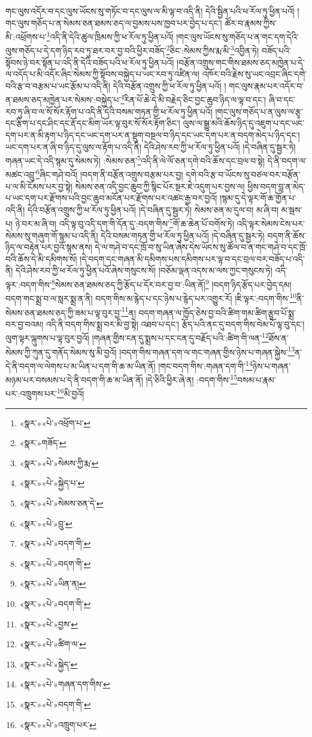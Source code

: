 གང་ལུས་འདོར་བ་དང་ལུས་ཡོངས་སུ་གཏོང་བ་དང་ལུས་ལ་མི་ལྟ་བ་འདི་ནི། དེའི་སྦྱིན་པའི་ཕ་རོལ་ཏུ་ཕྱིན་པའོ། །གང་ལུས་གཅོད་པ་ན་སེམས་ཅན་ཐམས་ཅད་ལ་བྱམས་པས་ཁྱབ་པར་བྱེད་པ་དང་། ཚོར་བ་རྣམས་ཀྱིས་མི་:འཕྲོགས་པ་\footnote{«སྣར་»«པེ་»འཕྲོག་པ་}འདི་ནི་དེའི་ཚུལ་ཁྲིམས་ཀྱི་ཕ་རོལ་ཏུ་ཕྱིན་པའོ། །གང་ལུས་ཡོངས་སུ་གཅོད་པ་ན་གང་དག་དེའི་ལུས་གཅོད་པ་དེ་དག་ཉིད་རབ་ཏུ་ཐར་བར་བྱ་བའི་ཕྱིར་བཟོད་\footnote{«སྣར་»གཟོད་}ཅིང་:སེམས་ཀྱིས་རྨ་མི་\footnote{«སྣར་»«པེ་»སེམས་ཀྱི་རྨ་}འབྱིན་ཏེ། བཟོད་པའི་སྟོབས་ཉེ་བར་སྟོན་པ་འདི་ནི་དེའི་བཟོད་པའི་ཕ་རོལ་ཏུ་ཕྱིན་པའོ། །བརྩོན་འགྲུས་གང་གིས་ཐམས་ཅད་མཁྱེན་པ་དེ་ལ་འདོད་པ་མི་འདོར་ཞིང་སེམས་ཀྱི་སྟོབས་བསྐྱེད་པ་ཡང་རབ་ཏུ་འཛིན་ལ། འཁོར་བའི་རྗེས་སུ་ཡང་འབྲང་ཞིང་དགེ་བའི་རྩ་བ་བརྩམ་པ་ཡང་རྩོམ་པ་འདི་ནི། དེའི་བརྩོན་འགྲུས་ཀྱི་ཕ་རོལ་ཏུ་ཕྱིན་པའོ། །
གང་ལུས་རྣམ་པར་འདོར་བ་ན་ཐམས་ཅད་མཁྱེན་པར་སེམས་:བསྐྱེད་པ་\footnote{«སྣར་»«པེ་»སྐྱེད་པ་}རིན་པོ་ཆེ་དེ་མི་བརྗེད་ཅིང་བྱང་ཆུབ་ཉིད་ལ་ལྟ་བ་དང་། ཞི་བ་དང་རབ་ཏུ་ཞི་བ་ལ་སོ་སོར་རྟོག་པ་འདི་ནི་དེའི་བསམ་གཏན་གྱི་ཕ་རོལ་ཏུ་ཕྱིན་པའོ། །གང་ལུས་གཅོད་པ་ན་ལུས་ལ་རྩྭ་དང་རྩིག་པ་དང་ཤིང་དང་རྡོ་དང་མིག་ཡོར་ལྟ་བུར་སོ་སོར་རྟོག་ཅིང་། ལུས་ལ་སྒྱུ་མའི་ཆོས་ཉིད་དུ་འཇུག་པ་དང་ཡང་དག་པར་ན་མི་རྟག་པ་ཉིད་དང་ཡང་དག་པར་ན་སྡུག་བསྔལ་བ་ཉིད་དང་ཡང་དག་པར་ན་བདག་མེད་པ་ཉིད་དང་། ཡང་དག་པར་ན་ཞི་བ་ཉིད་དུ་ལུས་ལ་རྟོག་པ་འདི་ནི། དེའི་ཤེས་རབ་ཀྱི་ཕ་རོལ་ཏུ་ཕྱིན་པའོ། །དེ་བཞིན་དུ་སྦྱར་ཏེ། གཞན་ཡང་དེ་འདི་སྙམ་དུ་སེམས་ཏེ། :སེམས་ཅན་\footnote{«སྣར་»«པེ་»སེམས་ཅན་དེ་}འདི་ནི་ལེ་ལོ་ཅན་དགེ་བའི་ཆོས་དང་བྲལ་བ་སྟེ། དེ་ནི་བདག་ལ་མཚང་འབྲུ་\footnote{«སྣར་»«པེ་»བྲུ་}ཞིང་གཤེ་བའོ། །བདག་ནི་བརྩོན་འགྲུས་བརྩམ་པར་བྱ། དགེ་བའི་རྩ་བ་ཡོངས་སུ་བཙལ་བར་བརྩོན་པ་ལ་མི་ངོམས་པར་བྱ་སྟེ། སེམས་ཅན་འདི་བྱང་ཆུབ་ཀྱི་སྙིང་པོར་སྔར་ཇེ་འདུག་པར་བྱས་ལ། ཕྱིས་བདག་བླ་ན་མེད་པ་ཡང་དག་པར་རྫོགས་པའི་བྱང་ཆུབ་མངོན་པར་རྫོགས་པར་འཚང་རྒྱ་བར་བྱའོ། །སྙམ་དུ་དེ་ལྟར་གོ་ཆ་གྱོན་པ་འདི་ནི། དེའི་བརྩོན་འགྲུས་ཀྱི་ཕ་རོལ་ཏུ་ཕྱིན་པའོ། །དེ་བཞིན་དུ་སྦྱར་ཏེ། སེམས་ཅན་མ་དུལ་བ། མ་ཞི་བ། མ་སྦས་པ། ཉེ་བར་མ་ཞི་བ། འདི་ལྟ་བུ་འདི་དག་གི་དོན་དུ་:བདག་གིས་\footnote{«སྣར་»«པེ་»བདག་གི་}གོ་ཆ་ཆེན་པོ་བགོས་ཏེ། འདི་ལྟར་སེམས་ངེས་པར་སེམས་སུ་གཞུག་གོ་སྙམ་པ་འདི་ནི། དེའི་བསམ་གཏན་གྱི་ཕ་རོལ་ཏུ་ཕྱིན་པའོ། །དེ་བཞིན་དུ་སྦྱར་ཏེ། བདག་ནི་ཆོས་ཉིད་ལ་བརྟེན་པར་བྱའོ་སྙམ་ནས། དེ་ལ་གཤེ་བ་དང་ཁྲོ་བ་སུ་ཡིན་ཞེས་དེས་ཡོངས་སུ་ཚོལ་བ་ན་གང་གཤེ་བ་དང་ཁྲོ་བའི་ཆོས་དེ་མི་དམིགས་སོ། །དེ་བདག་དང་གཞན་མི་དམིགས་པས་དམིགས་པར་ལྟ་བ་དང་བྲལ་བར་བཟོད་པ་འདི་ནི། དེའི་ཤེས་རབ་ཀྱི་ཕ་རོལ་ཏུ་ཕྱིན་པའོ་ཞེས་གསུངས་སོ། །བཅོམ་ལྡན་འདས་མ་ལས་ཀྱང་གསུངས་ཏེ། འདི་ལྟར་:བདག་གིས་\footnote{«སྣར་»«པེ་»བདག་གི་}སེམས་ཅན་ཐམས་ཅད་ཀྱི་རྩོད་པ་དོར་བར་བྱ་བ་:ཡིན་ནོ།\footnote{«སྣར་»«པེ་»ཡིན་ན།} །བདག་ཉིད་རྩོད་པར་བྱེད་དམ། བདག་གང་སྨྲ་བ་ལ་སླར་སྨྲ་ན་ནི། བདག་གིས་མ་རྙེད་པ་དང་ཉེས་པ་རྙེད་པར་འགྱུར་རོ། །ཇི་ལྟར་:བདག་གིས་\footnote{«སྣར་»«པེ་»བདག་གི་}ནི་སེམས་ཅན་ཐམས་ཅད་ཀྱི་ཟམ་པ་ལྟ་བུར་བྱ་\footnote{«སྣར་»«པེ་»བྱས་}ན། བདག་གཞན་ལ་ཁྱོད་ཅེས་བྱ་བའི་ཚིག་གམ་ཚིག་རྩུབ་པོ་སྨྲ་བར་བྱ་བའམ། འདི་ནི་བདག་གིས་སྨྲ་བར་མི་བྱ་སྟེ། འཐབ་པ་དང་། རྩོད་པའི་ནང་དུ་བདག་གིས་བེམ་པོ་ལྟ་བུ་དང་། ལུག་ལྟར་ལྐུགས་པ་ལྟ་བུར་བྱའོ། །གཞན་གྱིས་ངན་དུ་སྨྲས་པ་དང་ངན་དུ་བརྗོད་པའི་:ཚིག་གི་ལན་\footnote{«སྣར་»«པེ་»ཚིག་ལ་}ཐོས་ན་སེམས་ཀྱི་ཀུན་དུ་གནོད་སེམས་སུ་མི་བྱའོ། །བདག་གིས་གཞན་དག་ལ་གང་གཞན་གྱིས་ཉེས་པ་གཞན་སྐྱེས་\footnote{«སྣར་»«པེ་»སྐྱེད་}ན་དེ་ནི་བདག་ལ་ལེགས་པ་མ་ཡིན་པ་དག་གི་ཆ་མ་ཡིན་ནོ། །གང་བདག་གིས་:གཞན་དག་གི་\footnote{«སྣར་»«པེ་»གཞན་དག་གིས་}ཉེས་པ་གཞན་མཉམ་པར་བསམས་པ་དེ་ནི་བདག་གི་ཆ་མ་ཡིན་ནོ། །དེ་ཅིའི་ཕྱིར་ཞེ་ན། :བདག་གིས་\footnote{«སྣར་»«པེ་»བདག་གི་}བསམ་པ་རྣམ་པར་:འཁྲུགས་པར་\footnote{«སྣར་»«པེ་»འཁྲུག་པར་}མི་བྱའོ། 